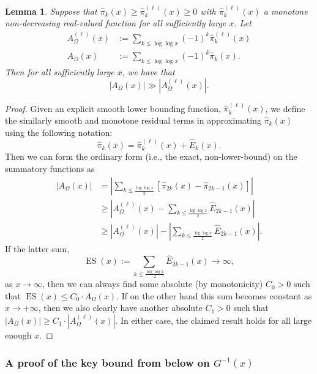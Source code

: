 \documentclass[11pt,reqno,a4letter]{article}
\numberwithin{figure}{section}
\numberwithin{table}{section}
\theoremstyle{plain}
\newtheorem{lemma}[theorem]{Lemma}
\numberwithin{theorem}{section}
\theoremstyle{definition}
\begin{document}
\begin{lemma} 
\label{lemma_lowerBoundsOnLambdaFuncParitySummFuncs} 
Suppose that $\widehat{\pi}_k(x) \geq \widehat{\pi}_k^{(\ell)}(x) \geq 0$ 
with $\widehat{\pi}_k^{(\ell)}(x)$ a monotone non-decreasing real-valued function 
for all sufficiently large $x$. 
Let 
\begin{align*} 
A_{\Omega}^{(\ell)}(x) & := \sum_{k \leq \log\log x} (-1)^k \widehat{\pi}_k^{(\ell)}(x) \\ 
A_{\Omega}(x) & := \sum_{k \leq \log\log x} (-1)^k \widehat{\pi}_k(x). 
\end{align*} 
Then for all sufficiently large $x$, we have that 
$$|A_{\Omega}(x)| \gg |A_{\Omega}^{(\ell)}(x)|.$$ 
\end{lemma} 
\begin{proof} 
Given an explicit smooth lower bounding function, $\widehat{\pi}_k^{(\ell)}(x)$, we define the 
similarly smooth and monotone residual terms in approximating $\widehat{\pi}_k(x)$ 
using the following notation: 
\[
\widehat{\pi}_k(x) = \widehat{\pi}_k^{(\ell)}(x) + \widehat{E}_k(x). 
\]
Then we can form the ordinary form (i.e., the exact, non-lower-bound) on the summatory functions as 
\begin{align*} 
|A_{\Omega}(x)| & = \left\lvert \sum_{k \leq \frac{\log\log x}{2}} 
     \left[\widehat{\pi}_{2k}(x) - \widehat{\pi}_{2k-1}(x)\right] \right\rvert \\ 
     & \geq \left\lvert A_{\Omega}^{(\ell)}(x) - \sum_{k \leq \frac{\log\log x}{2}} \widehat{E}_{2k-1}(x) 
     \right\rvert \\ 
     & \geq 
     \left\lvert A_{\Omega}^{(\ell)}(x) \right\rvert - 
     \left\lvert \sum_{k \leq \frac{\log\log x}{2}} \widehat{E}_{2k-1}(x) 
     \right\rvert. 
\end{align*} 
If the latter sum, $$\operatorname{ES}(x) := \sum_{k \leq \frac{\log\log x}{2}} \widehat{E}_{2k-1}(x) \rightarrow \infty,$$ as 
$x \rightarrow \infty$, then we can always find some absolute (by monotonicity) $C_0 > 0$ such that 
$\operatorname{ES}(x) \leq C_0 \cdot A_{\Omega}(x)$. If on the other hand this sum becomes constant as 
$x \rightarrow +\infty$, then we also clearly have another absolute $C_1 > 0$ such that 
$|A_{\Omega}(x)| \geq C_1 \cdot |A_{\Omega}^{(\ell)}(x)|$. 
In either case, the claimed result holds for all large enough $x$. 
\end{proof} 

\subsubsection{A proof of the key bound from below on $G^{-1}(x)$} 
\end{document}
